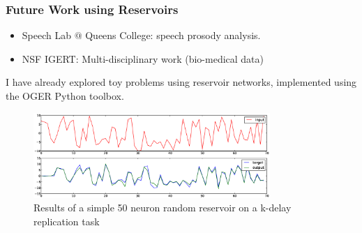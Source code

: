\documentclass{beamer}
\begin{document}
\begin{frame}
\frametitle{Future Work using Reservoirs}
\begin{itemize}
\item Speech Lab $@$ Queens College: speech prosody analysis.
\item NSF IGERT: Multi-disciplinary work (bio-medical data)
\end{itemize}

 I have already explored toy problems using reservoir networks, implemented using the OGER Python toolbox.
\begin{figure}[!htbp]
\centering
\includegraphics[width=0.8\textwidth]{pictures/my-res1.eps}
\caption{Results of a simple 50 neuron random reservoir on a k-delay replication task}
\label{fig:myres}
\end{figure}

\end{frame}
%
%
%






\end{document}
